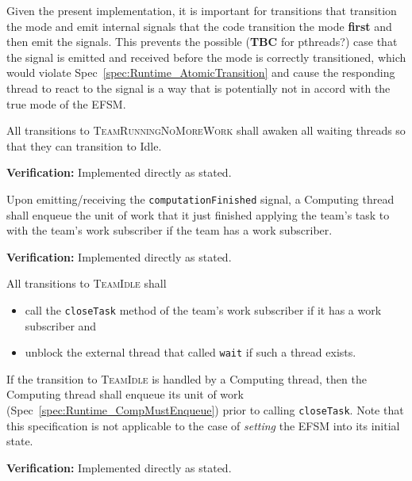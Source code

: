 \documentclass{article}
\newcommand{\TeamIdle}          {\textsc{TeamIdle}}
\newcommand{\TeamRunningNoMoreWork} {\textsc{TeamRunningNoMoreWork}}
\begin{document}
Given the present implementation, it is important for transitions that
transition the mode and emit internal signals that the code transition the mode
\textbf{first} and then emit the signals.  This prevents the possible
(\textbf{TBC} for pthreads?) case that the signal is emitted and received before
the mode is correctly transitioned, which would violate
Spec~\ref{spec:Runtime_AtomicTransition} and cause the responding thread
to react to the signal is a way that is potentially not in accord with the true
mode of the EFSM.

\begin{spec}
\label{spec:Runtime_AwakenOnNoMoreWork}
All transitions to {\TeamRunningNoMoreWork} shall awaken all waiting threads so
that they can transition to Idle.
\end{spec}
\textbf{Verification:}\hspace{0.125in}  Implemented directly as stated.

\begin{spec}
\label{spec:Runtime_CompMustEnqueue}
Upon emitting/receiving the \texttt{computationFinished} signal, a Computing
thread shall enqueue the unit of work that it just finished applying the team's
task to with the team's work subscriber if the team has a work subscriber.
\end{spec}
\textbf{Verification:}\hspace{0.125in}  Implemented directly as stated.

\begin{spec}
\label{spec:Runtime_IdleOutput}
All transitions to {\TeamIdle} shall
\begin{itemize}
\item{call the \texttt{closeTask} method of the team's work subscriber if it
has a work subscriber and }
\item{unblock the external thread that called \texttt{wait} if such a thread
exists.}
\end{itemize}
If the transition to {\TeamIdle} is handled by a Computing thread, then the
Computing thread shall enqueue its unit of work
(Spec~\ref{spec:Runtime_CompMustEnqueue}) prior to calling \texttt{closeTask}.
Note that this specification is not applicable to the case of \textit{setting}
the EFSM into its initial state.
\end{spec}
\textbf{Verification:}\hspace{0.125in}  Implemented directly as stated.
\end{document}
